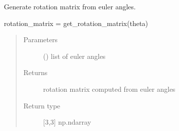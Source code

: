 \documentclass[letterpaper,10pt,english,openany,oneside]{sphinxmanual}
\begin{document}

\begin{fulllineitems}
\label{\detokenize{pygpc:pygpc.misc.get_rotation_matrix}}
Generate rotation matrix from euler angles.

rotation\_matrix = get\_rotation\_matrix(theta)
\begin{quote}\begin{description}
\item[{Parameters}] \leavevmode
{} () \textendash{} list of euler angles

\item[{Returns}] \leavevmode
{} \textendash{} rotation matrix computed from euler angles

\item[{Return type}] \leavevmode
{[}3,3{]} np.ndarray

\end{description}\end{quote}

\end{fulllineitems}

\end{document}

